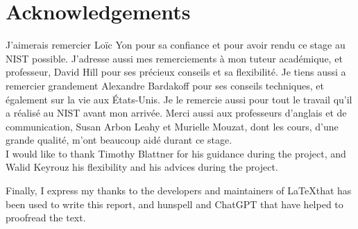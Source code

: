 
\clearpage{}
\pagestyle{empty}
\section*{Acknowledgements}

J'aimerais remercier Loïc Yon pour sa confiance et pour avoir rendu ce stage au
NIST possible. J'adresse aussi mes remerciements à mon tuteur académique, et
professeur, David Hill pour ses précieux conseils et sa flexibilité. Je tiens
aussi a remercier grandement Alexandre Bardakoff pour ses conseils techniques,
et également sur la vie aux États-Unis. Je le remercie aussi pour tout le
travail qu'il a réalisé au NIST avant mon arrivée. Merci aussi aux professeurs
d'anglais et de communication, Susan Arbon Leahy et Murielle Mouzat, dont les
cours, d'une grande qualité, m'ont beaucoup aidé durant ce stage.\\

I would like to thank Timothy Blattner for his guidance during the project, and
Walid Keyrouz his flexibility and his advices during the project.

Finally, I express my thanks to the developers and maintainers of \LaTeX that
has been used to write this report, and hunspell and ChatGPT that have helped to
proofread the text.

\clearpage{}
